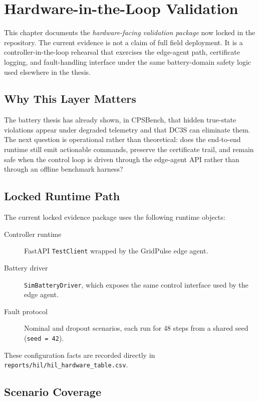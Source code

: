 \chapter{Hardware-in-the-Loop Validation}
\label{ch:hil}

This chapter documents the \emph{hardware-facing validation package} now
locked in the repository.  The current evidence is not a claim of full
field deployment.  It is a controller-in-the-loop rehearsal that exercises
the edge-agent path, certificate logging, and fault-handling interface under
the same battery-domain safety logic used elsewhere in the thesis.

\section{Why This Layer Matters}

The battery thesis has already shown, in CPSBench, that hidden
true-state violations appear under degraded telemetry and that DC3S can
eliminate them.  The next question is operational rather than theoretical:
does the end-to-end runtime still emit actionable commands, preserve the
certificate trail, and remain safe when the control loop is driven through
the edge-agent API rather than through an offline benchmark harness?

\section{Locked Runtime Path}

The current locked evidence package uses the following runtime objects:

\begin{description}
  \item[Controller runtime] FastAPI \texttt{TestClient} wrapped by the
    GridPulse edge agent.
  \item[Battery driver] \texttt{SimBatteryDriver}, which exposes the same
    control interface used by the edge agent.
  \item[Fault protocol] Nominal and dropout scenarios, each run for
    48 steps from a shared seed (\texttt{seed = 42}).
\end{description}

These configuration facts are recorded directly in
\texttt{reports/hil/hil\_hardware\_table.csv}.

\section{Scenario Coverage}

